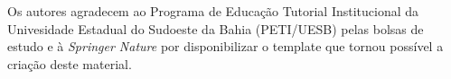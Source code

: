 %
%


Os autores agradecem ao Programa de Educa\c c\~ao Tutorial Institucional da Univesidade Estadual do Sudoeste da Bahia (PETI/UESB) pelas bolsas de estudo e à \textit{Springer Nature} por disponibilizar o template que tornou poss\'ivel a cria\c c\~ao deste material. 


